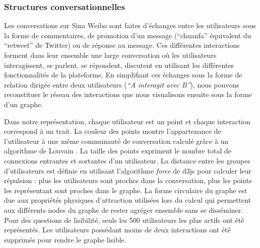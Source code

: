 \subsubsection[Structures conversationnelles]{Structures conversationnelles}
Les conversations sur Sina Weibo sont faites d{\textquoteright}\'echanges entre les utilisateurs sous la forme de commentaires, de promotion d{\textquoteright}un message ({\textquotedblleft}chuanfa{\textquotedblright} \'equivalent du {\textquotedblleft}retweet{\textquotedblright} de Twitter) ou de r\'eponse au message. Ces diff\'erentes interactions forment dans leur ensemble une large conversation o\`u les utilisateurs interagissent, se parlent, se r\'epondent, discutent en utilisant les diff\'erentes fonctionnalit\'es de la plateforme. En simplifiant ces \'echanges sous la forme de relation dirig\'ee entre deux utilisateurs (\textit{{\textquotedblleft}A interagit avec B{\textquotedblright}}), nous pouvons reconstituer le r\'eseau des interactions que nous visualisons ensuite sous la forme d{\textquoteright}un graphe.  

Dans notre repr\'esentation, chaque utilisateur est un point et chaque interaction correspond \`a un trait. La couleur des points montre l{\textquoteright}appartenance de l{\textquoteright}utilisateur \`a une m\^eme communaut\'e de conversation calcul\'e gr\^ace \`a un algorithme de Louvain \citep{Blondel2008}. La taille des points expriment le nombre total de connexions entrantes et sortantes d{\textquoteright}un utilisateur. La distance entre les groupes d{\textquoteright}utilisateurs est d\'efinie en utilisant l{\textquoteright}algorithme \textit{force} de d3js \citep{Bostock2011} pour calculer leur r\'epulsion : plus les utilisateurs sont proches dans la conversation, plus les points les repr\'esentant sont proches dans le graphe. La forme circulaire du graphe est due aux propri\'et\'es physiques d{\textquoteright}attraction utilis\'ees lors du calcul qui permettent aux diff\'erents nodes du graphe de rester agr\'eger ensemble sans se diss\'eminer. Pour des questions de lisibilit\'e, seuls les 500 utilisateurs les plus actifs ont \'et\'e repr\'esent\'es. Les utilisateurs poss\'edant moins de deux interactions ont \'et\'e supprim\'es pour rendre le graphe lisible. 

